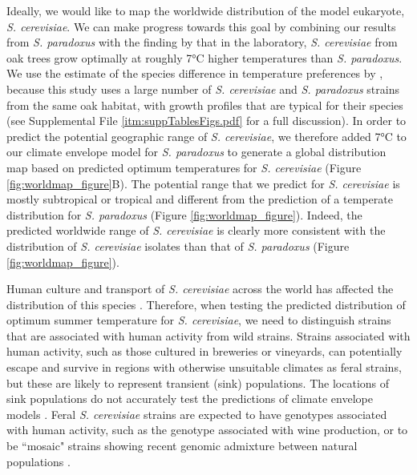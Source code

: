 \documentclass[12pt]{article}
\begin{document}
\begin{linenumbers}
Ideally, we would like to map the worldwide distribution of the model eukaryote, \textit{S. cerevisiae}. We can make progress towards this goal by combining our results from \textit{S. paradoxus} with the finding by \citet{sweeney_sympatric_2004} that in the laboratory, \textit{S. cerevisiae} from oak trees grow optimally at roughly 7\si{\degreeCelsius} higher temperatures than \textit{S. paradoxus}. We use the estimate of the species difference in temperature preferences by \citet{sweeney_sympatric_2004}, because this study uses a large number of \textit{S. cerevisiae} and \textit{S. paradoxus} strains from the same oak habitat, with growth profiles that are typical for their species (see Supplemental File \ref{itm:suppTablesFigs.pdf} for a full discussion). In order to predict the potential geographic range of \textit{S. cerevisiae}, we therefore added 7\si{\degreeCelsius} to our climate envelope model for \textit{S. paradoxus} to generate a global distribution map based on predicted optimum temperatures for \textit{S. cerevisiae} (Figure \ref{fig:worldmap_figure}B). The potential range that we predict for \textit{S. cerevisiae} is mostly subtropical or tropical and different from the prediction of a temperate distribution for \textit{S. paradoxus} (Figure \ref{fig:worldmap_figure}). Indeed, the predicted worldwide range of \textit{S. cerevisiae} is clearly more consistent with the distribution of \textit{S. cerevisiae} isolates than that of \textit{S. paradoxus} (Figure \ref{fig:worldmap_figure}). 

Human culture and transport of \textit{S. cerevisiae} across the world has affected the distribution of this species \citep{fay_evidence_2005,liti_population_2009,wang_surprisingly_2012,cromie_genomic_2013}. Therefore, when testing the predicted distribution of optimum summer temperature for \textit{S. cerevisiae}, we need to distinguish strains that are associated with human activity from wild strains. Strains associated with human activity, such as those cultured in breweries or vineyards, can potentially escape and survive in regions with otherwise unsuitable climates as feral strains, but these are likely to represent transient (sink) populations. The locations of sink populations do not accurately test the predictions of climate envelope models \citep{araujo_uses_2012}. Feral \textit{S. cerevisiae} strains are expected to have genotypes associated with human activity, such as the genotype associated with wine production, or to be ``mosaic" strains showing recent genomic admixture between natural populations \citep{fay_evidence_2005,liti_population_2009,wang_surprisingly_2012,cromie_genomic_2013,almeida_population_2015}.


\end{linenumbers}
\end{document}
